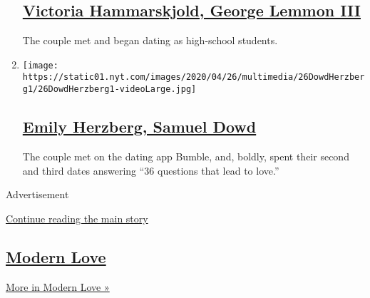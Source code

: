 \begin{enumerate}
{  \subsection{\texorpdfstring{\href{/2020/05/10/fashion/weddings/victoria-hammarskjold-george-lemmon-iii.html}{Victoria
  Hammarskjold, George Lemmon
  III}}{Victoria Hammarskjold, George Lemmon III}}\label{victoria-hammarskjold-george-lemmon-iii}}

  The couple met and began dating as high-school students.
\item
  \texttt{[image: https://static01.nyt.com/images/2020/04/26/multimedia/26DowdHerzberg1/26DowdHerzberg1-videoLarge.jpg]}

  \hypertarget{emily-herzberg-samuel-dowd}{%
  \subsection{\texorpdfstring{\href{/2020/04/26/fashion/weddings/emily-herzberg-samuel-dowd.html}{Emily
  Herzberg, Samuel
  Dowd}}{Emily Herzberg, Samuel Dowd}}\label{emily-herzberg-samuel-dowd}}

  The couple met on the dating app Bumble, and, boldly, spent their
  second and third dates answering ``36 questions that lead to love.''
\end{enumerate}

Advertisement

\protect\hyperlink{after-mid4}{Continue reading the main story}

\hypertarget{modern-love}{%
\subsection{\texorpdfstring{\href{/column/modern-love}{Modern
Love}}{Modern Love}}\label{modern-love}}

\href{/column/modern-love}{More in Modern Love »}

